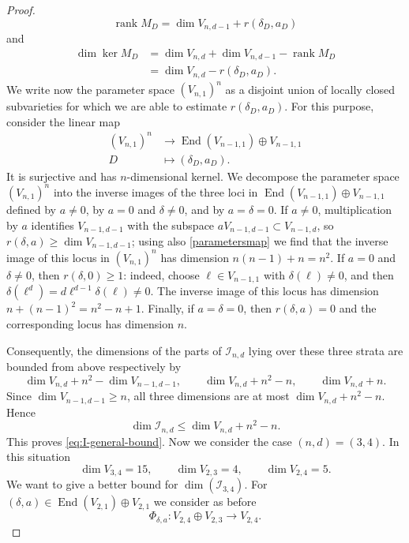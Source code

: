 \documentclass[a4paper,12pt,twoside,reqno]{amsart}
\numberwithin{equation}{section}
\theoremstyle{plain}
\theoremstyle{definition}
\DeclareMathOperator{\rank}{rank}
\theoremstyle{plain}
\theoremstyle{definition}
\begin{document}
\begin{proof}
\[
\rank M_D=\dim V_{n,d-1}+r(\delta_D,a_D)
\tag{3}\label{eq:rank-MD-two-parts}
\]
and
\[
\begin{aligned}
\dim\ker M_D
&=\dim V_{n,d}+\dim V_{n,d-1}-\rank M_D\\
&=\dim V_{n,d}-r(\delta_D,a_D).
\end{aligned}
\tag{4}\label{eq:kernel-MD-two-parts}
\]
We write now the parameter space $(V_{n,1})^n$ as a disjoint union of locally closed subvarieties for which we are able to   estimate \(r(\delta_D,a_D)\). For this purpose, consider the linear map
\begin{equation}
\label{parametersmap}
\begin{aligned}
(V_{n,1})^n
&\longrightarrow \operatorname{End}(V_{n-1,1})\oplus V_{n-1,1}\\
D&\longmapsto(\delta_D,a_D).
\end{aligned}
\end{equation}
It is surjective and has \(n\)-dimensional kernel. We decompose the parameter space $(V_{n,1})^n$ into the inverse images of the three loci in $\operatorname{End}(V_{n-1,1})\oplus V_{n-1,1}$ defined by $a\ne0$, by $a=0$ and $\delta\ne0$, and by $a=\delta=0$. If $a\ne0$, multiplication by $a$ identifies $V_{n-1,d-1}$ with the subspace $aV_{n-1,d-1}\subset V_{n-1,d}$, so $r(\delta,a)\ge \dim V_{n-1,d-1}$; using also \eqref{parametersmap} we find that  the inverse image of this locus in $(V_{n,1})^n$ has dimension $n(n-1)+n=n^2$. If $a=0$ and $\delta\ne0$, then $r(\delta,0)\ge1$: indeed, choose $\ell\in V_{n-1,1}$ with $\delta(\ell)\ne0$, and then $\delta(\ell^d)=d\ell^{d-1}\delta(\ell)\ne0$. The inverse image of this  locus has dimension $n+(n-1)^2=n^2-n+1$. Finally, if $a=\delta=0$, then $r(\delta,a)=0$ and the corresponding locus has dimension $n$. 

Consequently, the dimensions of the parts of $\mathcal I_{n,d}$ lying  over these three strata are bounded from above respectively by
\[
   \dim V_{n,d}+n^2-\dim V_{n-1,d-1},\qquad
   \dim V_{n,d}+n^2-n,\qquad
   \dim V_{n,d}+n.
\]
Since $\dim V_{n-1,d-1}\ge n$, all three dimensions are at most $\dim V_{n,d}+n^2-n$. Hence
\[
\dim\mathcal I_{n,d}\le\dim V_{n,d}+n^2-n.
\]
This proves \eqref{eq:I-general-bound}. Now we consider the case $(n,d)=(3,4)$. In this situation
\[
\dim V_{3,4}=15,
\qquad
\dim V_{2,3}=4,
\qquad
\dim V_{2,4}=5.
\]
We want to give a better bound for $\operatorname{dim}(\mathcal{I}_{3,4})$. For $(\delta,a) \in \operatorname{End}(V_{2,1}) \oplus V_{2,1}$ we consider as before
\[
\Phi_{\delta,a}\colon V_{2,4} \oplus V_{2,3} \rightarrow V_{2,4}.
\]



\end{proof}
\end{document}
